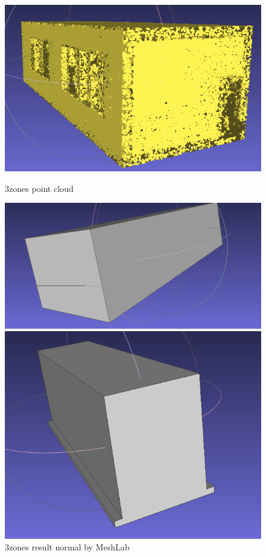 \documentclass{article}
\begin{document}
\vspace{0.5cm}
\begin{figure}[H]
  \centering
  \begin{minipage}[t]{0.29\textwidth}
    \includegraphics[width=\textwidth]{../../images/screen_kinetic/3zones_point_cloud.png}
    \caption*{3zones point cloud}
  \end{minipage}
  \begin{minipage}[t]{0.29\textwidth}
    \includegraphics[width=\textwidth]{../../images/screen_kinetic/3zones_result_normal5_cgal.png}
    \caption*{3zones result normal by MeshLab}
  \end{minipage}
  \begin{minipage}[t]{0.27\textwidth}
    \includegraphics[width=\textwidth]{../../images/screen_kinetic/3zones_result_normal_cgal.png}

\end{minipage}
\end{figure}
\end{document}
